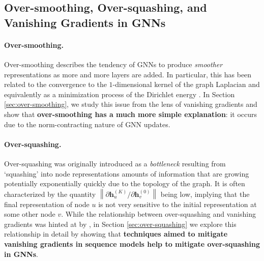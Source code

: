 \vspace{-0.2cm}



\subsection{Over-smoothing, Over-squashing, and Vanishing Gradients in GNNs}
\vspace{-0.1cm}
\paragraph{Over-smoothing.} Over-smoothing \cite{cai2020note, oono2020graph, rusch2023survey} describes the tendency of GNNs to produce \emph{smoother} representations as more and more layers are added. In particular, this has been related to the convergence to the $1$-dimensional kernel of the graph Laplacian and equivalently as a minimization process of the Dirichlet energy \cite{di2022graph}. In Section \ref{sec:over-smoothing}, we study this issue from the lens of vanishing gradients and show that \textbf{over-smoothing has a much more simple explanation}: it occurs due to the norm-contracting nature of GNN updates.
\vspace{-0.15cm}

\paragraph{Over-squashing.} Over-squashing \cite{Alon2021OnTB, topping2021understanding, di2023over, barbero2024transformers} was originally introduced as a \textit{bottleneck} resulting from `squashing' into node representations amounts of information that are growing potentially exponentially quickly due to the topology of the graph. It is often characterized by the quantity $\left \lVert \partial \mathbf{h}_u^{(K)} / \partial \mathbf{h}_v^{(0)} \right \rVert$ being low, implying that the final representation of node $u$ is not very sensitive to the initial representation at some other node $v$. While the relationship between over-squashing and vanishing gradients was hinted at by \citet{di2023over}, in Section \ref{sec:over-squashing} we explore this relationship in detail by showing that \textbf{techniques aimed to mitigate vanishing gradients in sequence models help to mitigate over-squashing in GNNs}.

